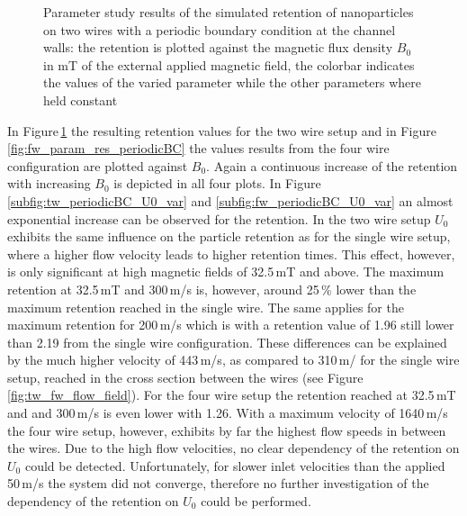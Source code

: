 \begin{figure}
        \caption[Parameter study results of the simulated retention of nanoparticles on two wires with a periodic boundary condition at the channel walls]{Parameter study results of the simulated retention of nanoparticles on two wires with a periodic boundary condition at the channel walls: the retention is plotted against the magnetic flux density $B_{0}$ in mT of the external applied magnetic field, the colorbar indicates the values of the varied parameter while the other parameters where held constant }
        \label{fig:tw_param_res_periodicBC}
  \end{figure}

In Figure\,\ref{fig:tw_param_res_periodicBC} the resulting retention values for the two wire setup and in Figure \,\ref{fig:fw_param_res_periodicBC} the values results from the four wire configuration are plotted against $B_{0}$. Again a continuous increase of the retention with increasing $B_{0}$ is depicted in all four plots. In Figure \ref{subfig:tw_periodicBC_U0_var} and \ref{subfig:fw_periodicBC_U0_var} an almost exponential increase can be observed for the retention. In the two wire setup $U_{0}$ exhibits the same influence on the particle retention as for the single wire setup, where a higher flow velocity leads to higher retention times. This effect, however, is only significant at high magnetic fields of 32.5\,mT and above. The maximum retention at 32.5\,mT and 300\,\textmu m/s is, however, around 25\,\% lower than the maximum retention reached in the single wire. The same applies for the maximum retention for 200\,\textmu m/s which is with a retention value of 1.96 still lower than 2.19 from the single wire configuration. These differences can be explained by the much higher velocity of 443\,\textmu m/s, as compared to 310\,\textmu m/ for the single wire setup, reached in the cross section between the wires (see Figure \ref{fig:tw_fw_flow_field}). For the four wire setup the retention reached at 32.5\,mT and and 300\,\textmu m/s is even lower with 1.26. With a maximum velocity of 1640\,\textmu m/s the four wire setup, however, exhibits by far the highest flow speeds in between the wires. Due to the high flow velocities, no clear dependency of the retention on $U_{0}$ could be detected. Unfortunately, for slower inlet velocities than the applied 50\,\textmu m/s the system did not converge, therefore no further investigation of the dependency of the retention on $U_{0}$ could be performed. \newline
